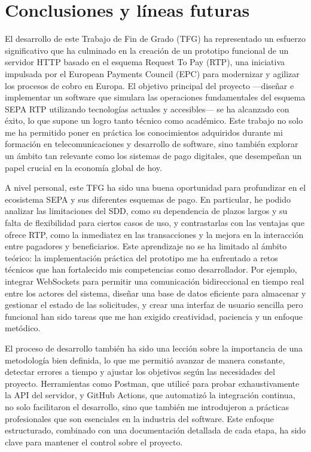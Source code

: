 \section{Conclusiones y líneas futuras}
\label{sec:Conclusiones}

El desarrollo de este Trabajo de Fin de Grado (TFG) ha representado un esfuerzo significativo que ha culminado en la creación de un prototipo funcional de un servidor HTTP basado en el esquema Request To Pay (RTP), una iniciativa impulsada por el European Payments Council (EPC) para modernizar y agilizar los procesos de cobro en Europa. El objetivo principal del proyecto —diseñar e implementar un software que simulara las operaciones fundamentales del esquema SEPA RTP utilizando tecnologías actuales y accesibles— se ha alcanzado con éxito, lo que supone un logro tanto técnico como académico. Este trabajo no solo me ha permitido poner en práctica los conocimientos adquiridos durante mi formación en telecomunicaciones y desarrollo de software, sino también explorar un ámbito tan relevante como los sistemas de pago digitales, que desempeñan un papel crucial en la economía global de hoy.


A nivel personal, este TFG ha sido una buena oportunidad para profundizar en el ecosistema SEPA y sus diferentes esquemas de pago. En particular, he podido analizar las limitaciones del SDD, como su dependencia de plazos largos y su falta de flexibilidad para ciertos casos de uso, y contrastarlas con las ventajas que ofrece RTP, como la inmediatez en las transacciones y la mejora en la interacción entre pagadores y beneficiarios. Este aprendizaje no se ha limitado al ámbito teórico: la implementación práctica del prototipo me ha enfrentado a retos técnicos que han fortalecido mis competencias como desarrollador. Por ejemplo, integrar WebSockets para permitir una comunicación bidireccional en tiempo real entre los actores del sistema, diseñar una base de datos eficiente para almacenar y gestionar el estado de las solicitudes, y crear una interfaz de usuario sencilla pero funcional han sido tareas que me han exigido creatividad, paciencia y un enfoque metódico.


El proceso de desarrollo también ha sido una lección sobre la importancia de una metodología bien definida, lo que me permitió avanzar de manera constante, detectar errores a tiempo y ajustar los objetivos según las necesidades del proyecto. Herramientas como Postman, que utilicé para probar exhaustivamente la API del servidor, y GitHub Actions, que automatizó la integración continua, no solo facilitaron el desarrollo, sino que también me introdujeron a prácticas profesionales que son esenciales en la industria del software. Este enfoque estructurado, combinado con una documentación detallada de cada etapa, ha sido clave para mantener el control sobre el proyecto.


